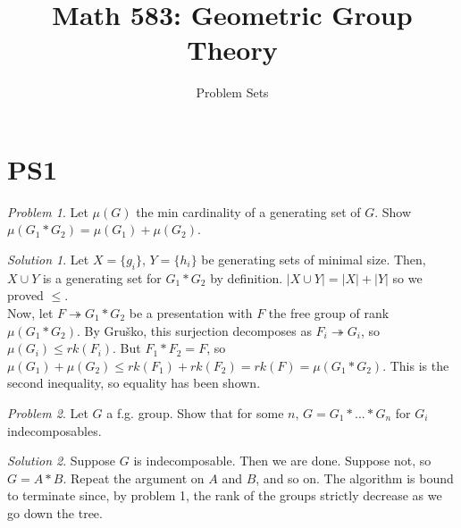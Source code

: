 \documentclass[11pt]{article}
\title{Math 583: Geometric Group Theory}
\author{Problem Sets}
\date{}
\theoremstyle{definition}
\theoremstyle{example}
\theoremstyle{remark}
\theoremstyle{lemma}
\theoremstyle{proposition}
\theoremstyle{Problem}
\newtheorem{problem}{Problem}[section]
\theoremstyle{Solution}
\newtheorem{solution}{Solution}[section]
\theoremstyle{theorem}
\theoremstyle{corollary}
\begin{document}
\maketitle


\section{PS1}
\begin{problem}
Let $\mu(G)$ the min cardinality of a generating set of $G$. Show $\mu(G_1*G_2) = \mu(G_1) + \mu(G_2)$.
\end{problem}
\begin{solution}
Let $X=\{g_i\}$, $Y=\{h_i\}$ be generating sets of minimal size. Then, $X\cup Y$ is a generating set for $G_1*G_2$ by definition. $|X\cup Y| = |X| + |Y|$ so we proved $\leq$.\\
Now, let $F \twoheadrightarrow G_1*G_2$ be a presentation with $F$ the free group of rank $\mu(G_1*G_2)$. By Gru\v{s}ko, this surjection decomposes as $F_i \twoheadrightarrow G_i$, so $\mu(G_i) \leq rk(F_i)$. But $F_1*F_2 = F$, so $\mu(G_1)+\mu(G_2) \leq rk(F_1) + rk(F_2) = rk(F) = \mu(G_1*G_2)$. This is the second inequality, so equality has been shown.\\
\end{solution}

\begin{problem}
Let $G$ a f.g. group. Show that for some $n$, $G=G_1*...*G_n$ for $G_i$ indecomposables.
\end{problem}
\begin{solution}
Suppose $G$ is indecomposable. Then we are done. Suppose not, so $G = A*B$. Repeat the argument on $A$ and $B$, and so on. The algorithm is bound to terminate since, by problem 1, the rank of the groups strictly decrease as we go down the tree.\\
\end{solution}
\end{document}
